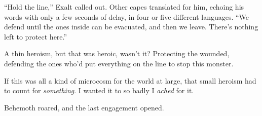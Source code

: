 ``Hold the line,'' Exalt called out.  Other capes translated for him, echoing his words with only a few seconds of delay, in four or five different languages.  ``We defend until the ones inside can be evacuated, and then we leave.  There's nothing left to protect here.''



A thin heroism, but that was heroic, wasn't it?  Protecting the wounded, defending the ones who'd put everything on the line to stop this monster.



If this was all a kind of microcosm for the world at large, that small heroism had to count for \emph{something}.  I wanted it to so badly I \emph{ached} for it.



Behemoth roared, and the last engagement opened.





